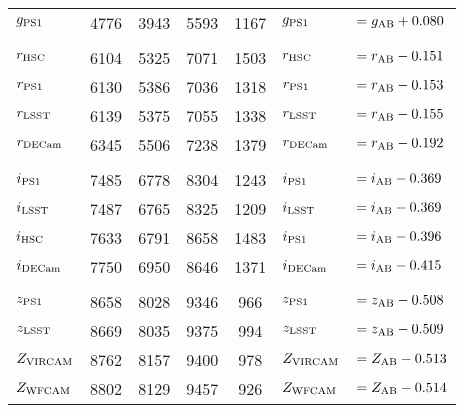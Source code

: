 \documentclass[usenatbib]{mnras}
\begin{document}
\begin{table*}
\begin{center}
\begin{tabular}{l r r r  c l l}
       $g_{\rm PS1}$        &    4776    &    3943    &    5593   &   1167        &  $g_{\rm PS1}$         &$  = g_{\rm AB} + 0.080 $ \\   %
      &&&&&&\\
      $r_{\rm HSC}$         &    6104     &   5325    &   7071	&   1503       & $r_{\rm HSC}   $       &$     = r_{\rm AB} - 0.151 $ \\
      $r_{\rm PS1}$         &    6130    & 	  5386    &    7036   &   1318       &  $r_{\rm PS1}   $       &$     = r_{\rm AB} - 0.153 $ \\ %
      $r_{\rm LSST}$       &     6139    &	  5375    &    7055   &   1338      &  $r_{\rm LSST}   $       &$    = r_{\rm AB} - 0.155 $ \\	
      $r_{\rm DECam}$   &      6345    &    5506    &    7238   &   1379      &  $r_{\rm DECam}$       &$   = r_{\rm AB} - 0.192 $ \\	     
      &&&&&&\\
      $i_{\rm PS1}$         &    7485    &     6778    &    8304   &   1243      &  $i_{\rm PS1}    $       &$   = i_{\rm AB} - 0.369 $ \\  %
      $i_{\rm LSST}$       &     7487    &	  6765    &     8325   &   1209      &  $i_{\rm LSST}   $       &$    = i_{\rm AB} - 0.369 $ \\   %
      $i_{\rm HSC}$         &   7633    &     6791    &     8658	&   1483       &  $i_{\rm PS1}    $       &$   = i_{\rm AB} - 0.396 $ \\  %
      $i_{\rm DECam}$   &      7750   &	  6950    &     8646    &   1371      &  $i_{\rm DECam} $     &$  = i_{\rm AB} - 0.415 $        \\	   
      &&&&&&\\
      $z_{\rm PS1}$        &    8658    &	 8028    &      9346   &      966      &  $z_{\rm PS1}   $      &$    = z_{\rm AB} - 0.508 $       \\
      $z_{\rm LSST}$      &     8669   & 	 8035    &      9375   &      994     &   $z_{\rm LSST}  $      &$    = z_{\rm AB} - 0.509 $     \\
      $Z_{\rm VIRCAM}$  &     8762   & 	 8157    &      9400   &      978    &   $Z_{\rm VIRCAM}  $   &$    = Z_{\rm AB} - 0.513 $     \\
      $Z_{\rm WFCAM}$  &     8802   & 	 8129    &      9457   &      926    &   $Z_{\rm WFCAM}  $   &$    = Z_{\rm AB} - 0.514 $     \\

\end{tabular}
\end{center}
\end{table*}
\end{document}
